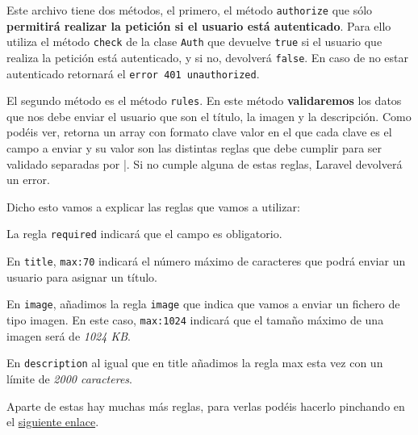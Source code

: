 \documentclass[11pt]{article}
\begin{document}
Este archivo tiene dos métodos, el primero, el método \texttt{authorize} que
sólo \textbf{permitirá realizar la petición si el usuario está
autenticado}. Para ello utiliza el método \texttt{check} de la clase \texttt{Auth}
que devuelve \texttt{true} si el usuario que realiza la petición está
autenticado, y si no, devolverá \texttt{false}. En caso de no estar autenticado
retornará el \texttt{error 401 unauthorized}.

El segundo método es el método \texttt{rules}. En este método \textbf{validaremos} los
datos que nos debe enviar el usuario que son el título, la imagen y la
descripción. Como podéis ver, retorna un array con formato clave valor
en el que cada clave es el campo a enviar y su valor son las distintas
reglas que debe cumplir para ser validado separadas por |. Si no
cumple alguna de estas reglas, Laravel devolverá un error.

Dicho esto vamos a explicar las reglas que vamos a utilizar:

La regla \texttt{required} indicará que el campo es obligatorio.

En \texttt{title}, \texttt{max:70} indicará el número máximo de caracteres que podrá
enviar un usuario para asignar un título.

En \texttt{image}, añadimos la regla \texttt{image} que indica que vamos a enviar un
fichero de tipo imagen. En este caso, \texttt{max:1024} indicará que el tamaño
máximo de una imagen será de \emph{1024 KB}.

En \texttt{description} al igual que en title añadimos la regla max esta vez
con un límite de \emph{2000 caracteres}.

Aparte de estas hay muchas más reglas, para verlas podéis hacerlo
pinchando en el \href{https://laravel.com/docs/10.x/validation}{siguiente enlace}.
\end{document}
